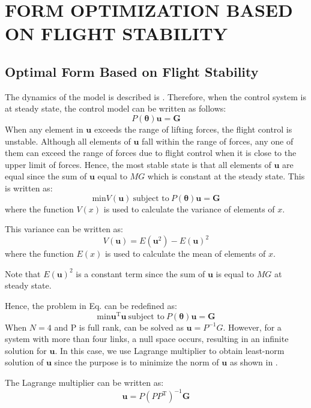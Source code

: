 \section{FORM OPTIMIZATION BASED ON FLIGHT STABILITY}
\subsection{Optimal Form Based on Flight Stability}
The dynamics of the model is described is . Therefore, when the control system is at steady state, the control model can be written as follows:
\begin{equation}
  P(\bm{\theta})\bm{u}=\bm{G}
  \label{eq:steady_state}
\end{equation}
When any element in $\bm{u}$ exceeds the range of lifting forces, the flight control is unstable. Although all elements of $\bm{u}$ fall within the range of forces, any one of them can exceed the range of forces due to flight control when it is close to the upper limit of forces. Hence, the most stable state is that all elements of $\bm{u}$ are equal since the sum of $\bm{u}$ equal to $MG$ which is constant at the steady state. This is written as:
\begin{equation}
  \text{min} V(\bm{u}) \ \text{subject to} \ P(\bm{\theta})\bm{u}=\bm{G}
  \label{eq:optimization}
\end{equation}
where the function $V(x)$ is used to calculate the variance of elements of $x$. 
\par
This variance can be written as:
\begin{equation}
  V(\bm{u})=E(\bm{u}^2)-E(\bm{u})^2
\end{equation}
where the function $E(x)$ is used to calculate the mean of elements of $x$. 
\par
Note that $E(\bm{u})^2$ is a constant term since the sum of $\bm{u}$ is equal to $MG$ at steady state.
\par
Hence, the problem in Eq.  can be redefined as:
\begin{equation}
  \text{min}\bm{u}^\mathrm{T}\bm{u} \ \text{subject to} \ P(\bm{\theta})\bm{u}=\bm{G}
  \label{eq:optimization2}
\end{equation}
When $N=4$ and P is full rank,  can be solved as $\bm{u}=P^{-1}G$. However, for a system with more than four links, a null space occurs, resulting in an infinite solution for $\bm{u}$. In this case, we use Lagrange multiplier to obtain least-norm solution of $\bm{u}$ since the purpose is to minimize the norm of $\bm{u}$ as shown in . 
\par
The Lagrange multiplier can be written as:
\begin{equation}
  \bm{u}=P(PP^\mathrm{T})^{-1}\bm{G}
  \label{eq:P_inv}
\end{equation}

